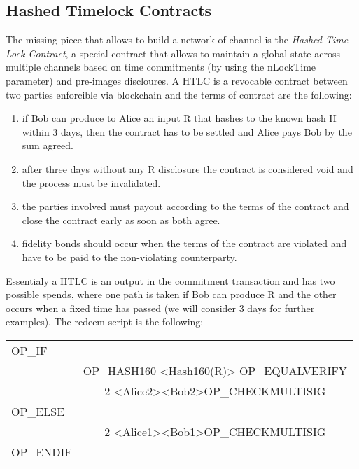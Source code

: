 		\subsection{Hashed Timelock Contracts}
		
		The missing piece that allows to build a network of channel is the \textit{Hashed Time-Lock Contract}, a special contract that allows to maintain a global state across multiple channels based on time commitments (by using the nLockTime parameter) and pre-images discloures. A HTLC is a revocable contract between two parties enforcible via blockchain and the terms of contract are the following:
		\begin{enumerate}			
			\item if Bob can produce to Alice an input R that hashes to the known hash H within 3 days, then the contract has to be settled and Alice pays Bob by the sum agreed.
			
			\item after three days without any R disclosure the contract is considered void and the process must be invalidated.
			
			\item the parties involved must payout according to the terms of the contract and close the contract early as soon as both agree.
			
			\item fidelity bonds should occur when the terms of the contract are violated and have to be paid to the non-violating counterparty.
		\end{enumerate}
	
		Essentialy a HTLC is an output in the commitment transaction and has two possible spends, where one path is taken if Bob can produce R and the other occurs when a fixed time has passed (we will consider 3 days for further examples). The redeem script is the following:
		\begin{center}
			\begin{tabulary}{\textwidth}{|L|C|}
				\hline
				OP\_IF & \\
				 & OP\_HASH160 <Hash160(R)> OP\_EQUALVERIFY \\
				 & 2 <Alice2><Bob2>OP\_CHECKMULTISIG \\ \hline
				OP\_ELSE & \\
				 & 2 <Alice1><Bob1>OP\_CHECKMULTISIG \\ \hline
				 OP\_ENDIF & \\
				 \hline				 
			\end{tabulary}
		\end{center}
	
